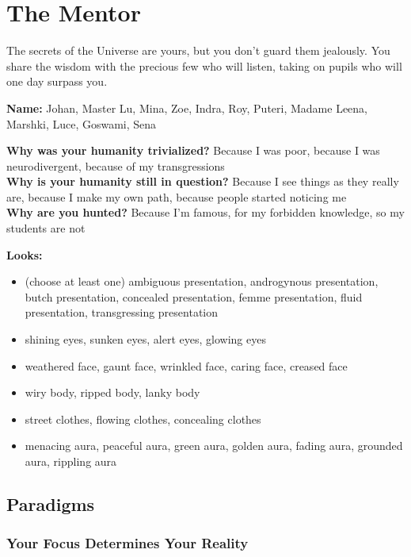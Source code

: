 \documentclass[10pt,twoside,openright]{memoir}
\begin{document}
\newpage

\hypertarget{the-mentor}{%
\section{The Mentor}\label{the-mentor}}

The secrets of the Universe are yours, but you don't guard them
jealously. You share the wisdom with the precious few who will listen,
taking on pupils who will one day surpass you.

\textbf{Name:} Johan, Master Lu, Mina, Zoe, Indra, Roy, Puteri, Madame
Leena, Marshki, Luce, Goswami, Sena

\textbf{Why was your humanity trivialized?} Because I was poor, because
I was neurodivergent, because of my transgressions\\
\textbf{Why is your humanity still in question?} Because I see things as
they really are, because I make my own path, because people started
noticing me\\
\textbf{Why are you hunted?} Because I'm famous, for my forbidden
knowledge, so my students are not

\textbf{Looks:}

\begin{itemize}
\tightlist
\item
  (choose at least one) ambiguous presentation, androgynous
  presentation, butch presentation, concealed presentation, femme
  presentation, fluid presentation, transgressing presentation
\item
  shining eyes, sunken eyes, alert eyes, glowing eyes
\item
  weathered face, gaunt face, wrinkled face, caring face, creased face
\item
  wiry body, ripped body, lanky body
\item
  street clothes, flowing clothes, concealing clothes
\item
  menacing aura, peaceful aura, green aura, golden aura, fading aura,
  grounded aura, rippling aura
\end{itemize}

\hypertarget{paradigms-1}{%
\subsection{Paradigms}\label{paradigms-1}}

\hypertarget{your-focus-determines-your-reality}{%
\subsubsection{Your Focus Determines Your
Reality}\label{your-focus-determines-your-reality}}
\end{document}
